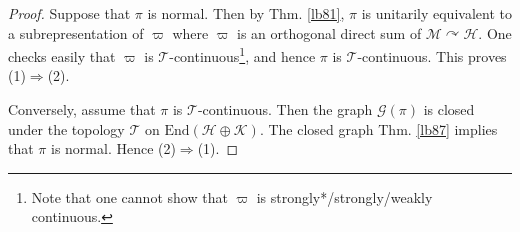 \documentclass[12pt,b5paper,notitlepage]{article}
\theoremstyle{definition}
\theoremstyle{plain}
\newtheorem{lm}[df]{Lemma}
\newcommand{\fk}{\mathfrak}
\newcommand{\mc}{\mathcal}
\newcommand{\End}{\mathrm{End}} %
\newcommand{\scr}{\mathscr}
\numberwithin{equation}{section}
\begin{document}
\begin{proof}
Suppose that $\pi$ is normal. Then by Thm. \ref{lb81}, $\pi$ is unitarily equivalent to a subrepresentation of $\varpi$ where $\varpi$ is an orthogonal direct sum of $\mc M\curvearrowright\mc H$. One checks easily that $\varpi$ is $\mc T$-continuous\footnote{Note that one cannot show that $\varpi$ is strongly*/strongly/weakly continuous.}, and hence $\pi$ is $\mc T$-continuous. This proves (1)$\Rightarrow$(2).

Conversely, assume that $\pi$ is $\mc T$-continuous. Then the graph $\scr G(\pi)$ is closed under the topology $\mc T$ on $\End(\mc H\oplus\mc K)$. The closed graph Thm. \ref{lb87} implies that $\pi$ is normal. Hence (2)$\Rightarrow$(1).
\end{proof}





\begin{comment}
\begin{lm}\label{lb83}
Let $U,V$ be topological vector spaced whose topologies are defined by the the sets of seminorms $\fk P$ and $\fk Q$ respectively. Assume that $T:U\rightarrow V$ is a continuous linear map. Then for each $q\in\fk Q$ there exists $C>0$ and $p_1,\dots,p_n\in\fk P$ such that for all $\xi\in U$ we have
\begin{align*}
q\circ T(\xi)\leq C\max\{p_1(\xi),\cdots,p_n(\xi)\}
\end{align*}
\end{lm}

\begin{proof}
Since $T$ is continuous at $0$, there exist $C>0$ and $p_1,\dots,p_n\in\fk P$ such that setting $p=C\max\{p_1,\cdots,p_n\}$, we have $q\circ T(\xi)< 1$ whenever $p(\xi)< 1$. Thus for each $\xi\in U$, and for each $r>p(\xi)$ we have $p(r^{-1}\xi)<1$ and hence $q\circ T(r^{-1}\xi)<1$. Thus $q\circ T(\xi)<r$. Letting $r\searrow p(\xi)$, we get $q\circ T(\xi)\leq p(\xi)$.
\end{proof}
\end{comment}
\end{document}
